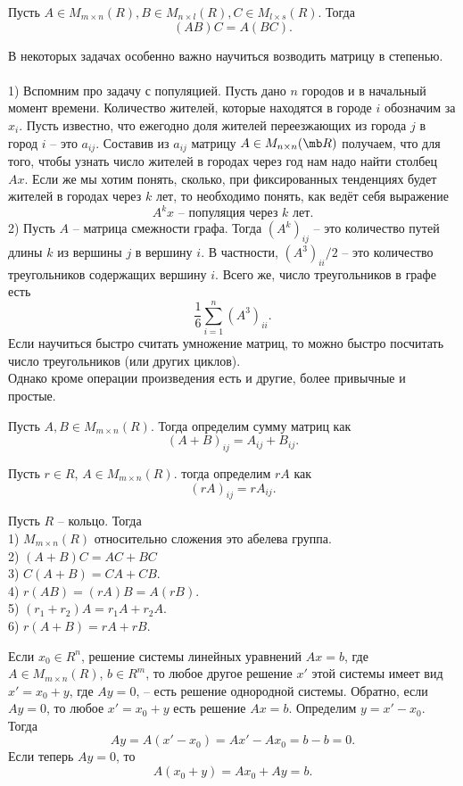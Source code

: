 \utv Пусть $A\in M_{m\times n}(R), B \in M_{n\times l}(R), C\in M_{l\times s}(R)$. Тогда
$$(AB)C= A(BC).$$
\eutv

\noindent В некоторых задачах особенно важно научиться возводить матрицу в степенью.\\
\exm\\
1) Вспомним про задачу с популяцией. Пусть дано $n$ городов и в начальный момент времени. Количество жителей, которые находятся в городе $i$ обозначим за $x_i$. Пусть известно, что ежегодно доля жителей переезжающих из города $j$ в город $i$ -- это $a_{ij}$. Составив из $a_{ij}$ матрицу $A\in M_{n\times n}(\mb R)$ получаем, что для того, чтобы узнать число жителей в городах через год нам надо найти столбец $Ax$. Если же мы хотим понять, сколько, при фиксированных тенденциях будет жителей в городах через $k$ лет, то необходимо понять, как ведёт себя выражение 
$$A^k x \text{ -- популяция через $k$ лет}.$$
2) Пусть $A$ -- матрица смежности графа. Тогда $(A^k)_{ij}$ -- это количество путей длины $k$ из вершины $j$ в вершину $i$. В частности, $(A^3)_{ii}/2$ -- это количество треугольников  содержащих вершину $i$. Всего же, число треугольников в графе есть 
$$\frac{1}{6}\sum_{i=1}^n (A^3)_{ii}.$$
Если научиться быстро считать умножение матриц, то можно быстро посчитать число треугольников (или других циклов).\\

Однако кроме операции произведения есть и другие, более привычные и простые.

\dfn Пусть $A,B\in M_{m\times n}(R)$. Тогда определим сумму матриц как 
$$(A+B)_{ij}=A_{ij}+B_{ij}.$$
\edfn

\dfn Пусть $r\in R$, $A\in M_{m\times n}(R)$. тогда определим $rA$ как 
$$(rA)_{ij}=rA_{ij}.$$
\edfn

\utv Пусть $R$ -- кольцо. Тогда\\
1) $M_{m\times n}(R)$ относительно сложения это абелева группа.\\
2) $(A+B)C=AC+BC$\\
3) $C(A+B)=CA+CB$.\\
4) $r(AB)=(rA)B=A(rB)$.\\
5) $(r_1+r_2)A=r_1A+r_2A$.\\
6) $r(A+B)=rA+rB$.
\eutv

\crl Если $x_0\in R^n$, решение системы линейных уравнений $Ax=b$, где $A\in M_{m\times n}(R)$, $b\in R^m$, то любое другое решение $x'$ этой системы имеет вид $x'=x_0+y$, где $Ay=0$, -- есть решение однородной системы. Обратно, если $Ay=0$, то любое $x'=x_0+y$ есть решение  $Ax=b$.
\proof Определим $y=x'-x_0$. Тогда $$Ay=A(x'-x_0)=Ax'-Ax_0=b-b=0.$$
Если теперь $Ay=0$, то 
$$A(x_0+y)=Ax_0+Ay=b.$$

